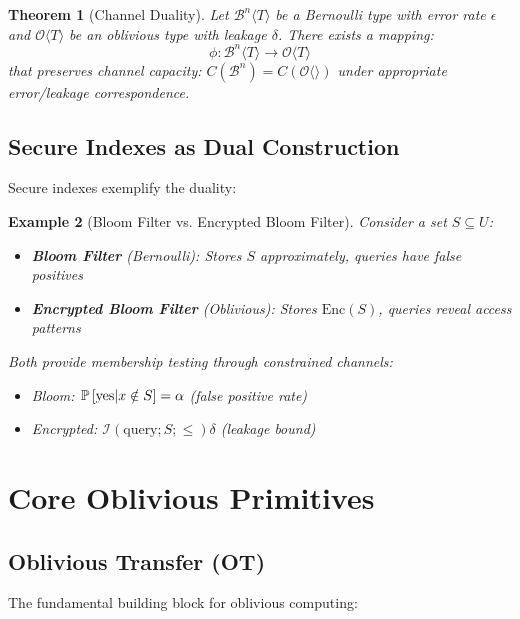 \documentclass[11pt,final]{article}
\newtheorem{theorem}{Theorem}[section]
\newtheorem{example}[theorem]{Example}
\newcommand{\Oblivious}[1]{\mathcal{O}\langle #1 \rangle}
\newcommand{\MutualInfo}[2]{\mathcal{I}(#1; #2)}
\begin{document}
\begin{theorem}[Channel Duality]
Let $\mathcal{B}^n\langle T \rangle$ be a Bernoulli type with error rate $\epsilon$ and $\Oblivious{T}$ be an oblivious type with leakage $\delta$. There exists a mapping:
\begin{equation}
\phi: \mathcal{B}^n\langle T \rangle \to \Oblivious{T}
\end{equation}
that preserves channel capacity: $C(\mathcal{B}^n) = C(\Oblivious{})$ under appropriate error/leakage correspondence.
\end{theorem}

\subsection{Secure Indexes as Dual Construction}

Secure indexes exemplify the duality:

\begin{example}[Bloom Filter vs. Encrypted Bloom Filter]
Consider a set $S \subseteq U$:
\begin{itemize}
    \item \textbf{Bloom Filter} (Bernoulli): Stores $S$ approximately, queries have false positives
    \item \textbf{Encrypted Bloom Filter} (Oblivious): Stores $\text{Enc}(S)$, queries reveal access patterns
\end{itemize}

Both provide membership testing through constrained channels:
\begin{itemize}
    \item Bloom: $\mathbb{P}\left[\text{yes}|x \notin S\right] = \alpha$ (false positive rate)
    \item Encrypted: $\MutualInfo{\text{query}; S} \leq \delta$ (leakage bound)
\end{itemize}
\end{example}

\section{Core Oblivious Primitives}

\subsection{Oblivious Transfer (OT)}

The fundamental building block for oblivious computing:
\end{document}
